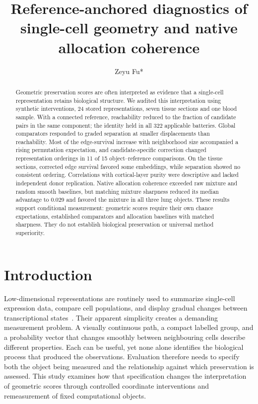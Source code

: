 \documentclass[11pt]{article}
\title{\textbf{Reference-anchored diagnostics of single-cell geometry and native allocation coherence}}
\author[1]{Zeyu Fu*}
\affil[1]{\hspace{0.2em}State Key Laboratory of Trauma and Chemical Poisoning, Institute of Combined Injury,
Chongqing Engineering Research Center for Nanomedicine, College of Preventive Medicine,
Army Medical University, Chongqing, China\\\texttt{fuzeyu09@gmail.com}}
\date{}
\begin{document}
\maketitle

\begin{abstract}
Geometric preservation scores are often interpreted as evidence that a single-cell representation retains biological structure. We audited this interpretation using synthetic interventions, 24 stored representations, seven tissue sections and one blood sample. With a connected reference, reachability reduced to the fraction of candidate pairs in the same component; the identity held in all 322 applicable batteries. Global comparators responded to graded separation at smaller displacements than reachability. Most of the edge-survival increase with neighborhood size accompanied a rising permutation expectation, and candidate-specific correction changed representation orderings in 11 of 15 object--reference comparisons. On the tissue sections, corrected edge survival favored some embeddings, while separation showed no consistent ordering. Correlations with cortical-layer purity were descriptive and lacked independent donor replication. Native allocation coherence exceeded raw mixture and random smooth baselines, but matching mixture sharpness reduced its median advantage to 0.029 and favored the mixture in all three lung objects. These results support conditional measurement: geometric scores require their own chance expectations, established comparators and allocation baselines with matched sharpness. They do not establish biological preservation or universal method superiority.
\end{abstract}

\section{Introduction}

Low-dimensional representations are routinely used to summarize single-cell expression data, compare cell populations, and display gradual changes between transcriptional states~\cite{luecken2019practices,becht2019umap}. Their apparent simplicity creates a demanding measurement problem. A visually continuous path, a compact labelled group, and a probability vector that changes smoothly between neighbouring cells describe different properties. Each can be useful, yet none alone identifies the biological process that produced the observations. Evaluation therefore needs to specify both the object being measured and the relationship against which preservation is assessed. This study examines how that specification changes the interpretation of geometric scores through controlled coordinate interventions and remeasurement of fixed computational objects.
\end{document}
